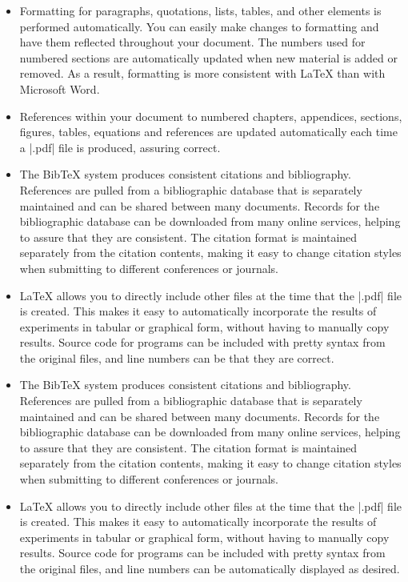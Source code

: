 \begin{itemize}

\item Formatting for paragraphs, quotations, lists, tables, and other elements
  is performed automatically. You can easily make changes to formatting and
  have them reflected throughout your document.  The numbers used for numbered
  sections are automatically updated when new material is added or removed. As
  a result, formatting is more consistent with \LaTeX{} than with Microsoft
  Word.

\item References within your document to numbered chapters, appendices,
  sections, figures, tables, equations and references are updated automatically
  each time a |.pdf| file is produced, assuring correct.

\item The Bib\TeX{} system produces consistent citations and bibliography.
  References are pulled from a bibliographic database that is separately
  maintained and can be shared between many documents. Records for the
  bibliographic database can be downloaded from many online services, helping
  to assure that they are consistent. The citation format is maintained
  separately from the citation contents, making it easy to change citation
  styles when submitting to different conferences or journals.  

\item \LaTeX{} allows you to directly include other files at the time that the
  |.pdf| file is created. This makes it easy to automatically incorporate the
  results of experiments in tabular or graphical form, without having to
  manually copy results.  Source code for programs can be included with pretty
  syntax from the original files, and line numbers can be that they are
  correct.

\item The Bib\TeX{} system produces consistent citations and bibliography.
  References are pulled from a bibliographic database that is separately
  maintained and can be shared between many documents. Records for the
  bibliographic database can be downloaded from many online services, helping
  to assure that they are consistent. The citation format is maintained
  separately from the citation contents, making it easy to change citation
  styles when submitting to different conferences or journals.  

\item \LaTeX{} allows you to directly include other files at the time that the
  |.pdf| file is created. This makes it easy to automatically incorporate the
  results of experiments in tabular or graphical form, without having to
  manually copy results.  Source code for programs can be included with pretty
  syntax from the original files, and line numbers can be automatically
  displayed as desired. 


\end{itemize}
